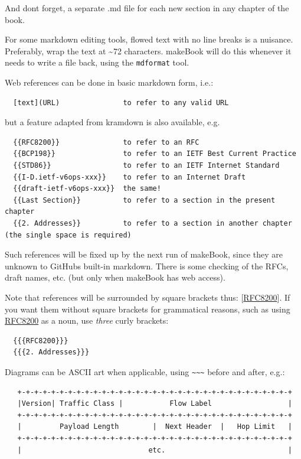 \documentclass[
]{article}
\begin{document}
And don\textquotesingle t forget, a separate .md file for each new
section in any chapter of the book.

For some markdown editing tools, flowed text with no line breaks is a
nuisance. Preferably, wrap the text at \textasciitilde72 characters.
makeBook will do this whenever it needs to write a file back, using the
\texttt{mdformat} tool.

Web references can be done in basic markdown form, i.e.:

\begin{verbatim}
  [text](URL)               to refer to any valid URL
\end{verbatim}

but a feature adapted from kramdown is also available, e.g.

\begin{verbatim}
  {{RFC8200}}               to refer to an RFC
  {{BCP198}}                to refer to an IETF Best Current Practice
  {{STD86}}                 to refer to an IETF Internet Standard
  {{I-D.ietf-v6ops-xxx}}    to refer to an Internet Draft
  {{draft-ietf-v6ops-xxx}}  the same!
  {{Last Section}}          to refer to a section in the present chapter
  {{2. Addresses}}          to refer to a section in another chapter  (the single space is required) 
\end{verbatim}

Such references will be fixed up by the next run of makeBook, since they
are unknown to GitHub\textquotesingle s built-in markdown. There is some
checking of the RFCs, draft names, etc. (but only when makeBook has web
access).

Note that references will be surrounded by square brackets thus:
{[}\href{https://www.rfc-editor.org/info/rfc8200}{RFC8200}{]}. If you
want them without square brackets for grammatical reasons, such as using
\href{https://www.rfc-editor.org/info/rfc8200}{RFC8200} as a noun, use
\emph{three} curly brackets:

\begin{verbatim}
  {{{RFC8200}}}
  {{{2. Addresses}}}
\end{verbatim}

Diagrams can be ASCII art when applicable, using
\texttt{\textasciitilde{}\textasciitilde{}\textasciitilde{}} before and
after, e.g.:

\begin{verbatim}
   +-+-+-+-+-+-+-+-+-+-+-+-+-+-+-+-+-+-+-+-+-+-+-+-+-+-+-+-+-+-+-+-+
   |Version| Traffic Class |           Flow Label                  |
   +-+-+-+-+-+-+-+-+-+-+-+-+-+-+-+-+-+-+-+-+-+-+-+-+-+-+-+-+-+-+-+-+
   |         Payload Length        |  Next Header  |   Hop Limit   |
   +-+-+-+-+-+-+-+-+-+-+-+-+-+-+-+-+-+-+-+-+-+-+-+-+-+-+-+-+-+-+-+-+
   |                              etc.                             |
\end{verbatim}
\end{document}
